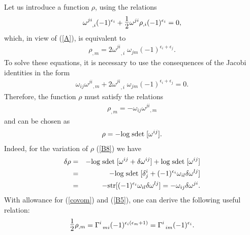 \documentclass[a4paper,11pt]{article}
\begin{document}
\begin{appendix}
Let us introduce a function $\rho$, using the  relations
\begin{eqnarray}
    \label{B4} \omega^{ji}_{\;\;\;,i}  (-1)^{\epsilon_i}
    +\hbox{\Large$\frac{1}{2}$}\omega^{ji}\rho_{,i}  (-1)^{\epsilon_i}
    =0,
\end{eqnarray}
which, in view of (\ref{A}), is equivalent to
\begin{eqnarray}
\label{B5}
\rho_{,m}=2\omega^{ji}_{\;\;\;,i}\;\omega_{jm}
(-1)^{\epsilon_i+\epsilon_j}.
\end{eqnarray}
To solve these equations, it is necessary to use the consequences
of the Jacobi identities in the form
\begin{eqnarray}
\label{B6}
\omega_{ij}\omega^{ji}_{\;\;\;,m}+2\omega^{ji}_{\;\;\;,i}\;\omega_{jm}
(-1)^{\epsilon_i+\epsilon_j}=0.
\end{eqnarray}
Therefore, the function $\rho$ must satisfy the relations
\begin{eqnarray}
\label{B7}
\rho_{,m}=-\omega_{ij}\omega^{ji}_{\;\;\;,m}
\end{eqnarray}
and can be chosen as
\begin{eqnarray}
\label{B8}
 \rho=-{\rm log}\;{\rm sdet}\;[\omega^{ij}].
\end{eqnarray}
Indeed, for the variation of $\rho$ (\ref{B8}) we have
\begin{eqnarray}
\label{B9}
\nonumber
\delta\rho&=&-{\rm log}\;{\rm sdet}\;[\omega^{ij}+\delta\omega^{ij}]
+{\rm log}\;{\rm sdet}\;[\omega^{ij}]\\
\nonumber &=&-{\rm log}\;{\rm sdet}\;[\delta^i_j+
(-1)^{\epsilon_i}\omega_{il}\delta\omega^{lj}]\\
&=&-{\rm str}[(-1)^{\epsilon_i}\omega_{il}\delta\omega^{lj}]=
-\omega_{ij}\delta\omega^{ji}.
\end{eqnarray}
With allowance for (\ref{covom}) and (\ref{B5}), one can derive
the following useful relation:
\begin{eqnarray}
\label{B10} \hbox{\Large$\frac{1}{2}$}\rho_{,m}=
\Gamma^i_{\;\;mi}(-1)^{\epsilon_i(\epsilon_m+1)}=
\Gamma^i_{\;\;im} (-1)^{\epsilon_i}.
\end{eqnarray}


\end{appendix}
\end{document}
